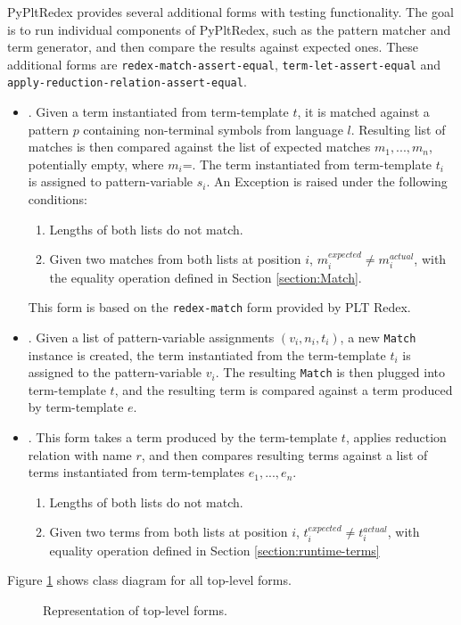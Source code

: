 PyPltRedex provides several additional forms with testing functionality. The goal is to run individual components of PyPltRedex, such as the pattern matcher and term generator, and then compare the results against expected ones. These additional forms are \texttt{redex-match-assert-equal}, \texttt{term-let-assert-equal} and \\ \texttt{apply-reduction-relation-assert-equal}.

\begin{itemize}
\item \RedexMatchAssertEqual. Given a term instantiated from term-template $t$, it is matched against a pattern $p$ containing non-terminal symbols from language $l$. Resulting list of matches is then compared against the list of expected matches $m_1,...,m_n$, potentially empty, where $m_i$=\Match. The term instantiated from term-template $t_i$ is assigned to pattern-variable $s_i$. An Exception is raised under the following conditions:
	\begin{enumerate}
	\item Lengths of both lists do not match.
	\item Given two matches from both lists at position $i$, $m_i^{expected} \neq m_i^{actual}$, with the equality operation defined in Section \ref{section:Match}.
	\end{enumerate}
	This form is based on the \texttt{redex-match} form provided by PLT Redex.

\item \TermLetAssertEqual. Given a list of pattern-variable assignments $(v_i, n_i, t_i)$, a new \texttt{Match} instance is created, the term instantiated from the term-template $t_i$ is assigned to the pattern-variable $v_i$. The resulting \texttt{Match} is then plugged into term-template $t$, and the resulting term is compared against a term produced by term-template $e$.

\item \ApplyReductionRelationAssertEqual. This form takes a term produced by the term-template $t$, applies reduction relation with name $r$, and then compares resulting terms against a list of terms instantiated from term-templates $e_1,...,e_n$.
	\begin{enumerate}
	\item Lengths of both lists do not match.
	\item Given two terms from both lists at position $i$, $t_i^{expected} \neq t_i^{actual}$, with equality operation defined in Section \ref{section:runtime-terms}
	\end{enumerate}
\end{itemize}

Figure \ref{class-diagram-toplevel} shows class diagram for all top-level forms.

\begin{figure}[H]
	\centering
	\caption{Representation of top-level forms.}
\label{class-diagram-toplevel}
\end{figure}
